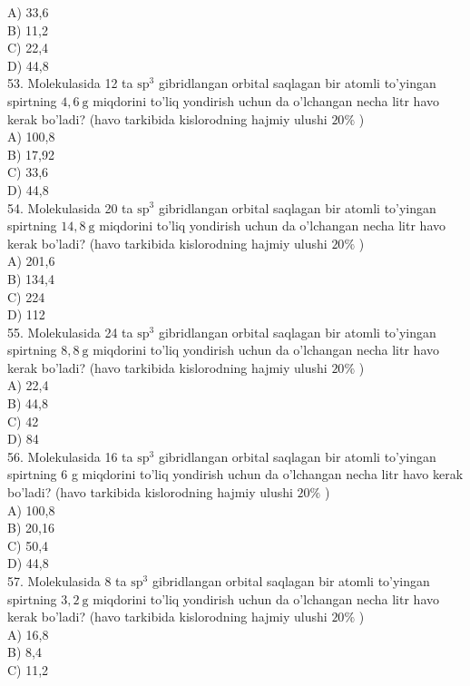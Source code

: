 A) 33,6\\
B) 11,2\\
C) 22,4\\
D) 44,8\\
53. Molekulasida 12 ta $\mathrm{sp}^{3}$ gibridlangan orbital saqlagan bir atomli to'yingan spirtning $4,6 \mathrm{~g}$ miqdorini to'liq yondirish uchun da o'lchangan necha litr havo kerak bo'ladi? (havo tarkibida kislorodning hajmiy ulushi $20 \%$ )\\
A) 100,8\\
B) 17,92\\
C) 33,6\\
D) 44,8\\
54. Molekulasida 20 ta $\mathrm{sp}^{3}$ gibridlangan orbital saqlagan bir atomli to'yingan spirtning $14,8 \mathrm{~g}$ miqdorini to'liq yondirish uchun da o'lchangan necha litr havo\\
kerak bo'ladi? (havo tarkibida kislorodning hajmiy ulushi $20 \%$ )\\
A) 201,6\\
B) 134,4\\
C) 224\\
D) 112\\
55. Molekulasida 24 ta $\mathrm{sp}^{3}$ gibridlangan orbital saqlagan bir atomli to'yingan spirtning $8,8 \mathrm{~g}$ miqdorini to'liq yondirish uchun da o'lchangan necha litr havo kerak bo'ladi? (havo tarkibida kislorodning hajmiy ulushi $20 \%$ )\\
A) 22,4\\
B) 44,8\\
C) 42\\
D) 84\\
56. Molekulasida 16 ta $\mathrm{sp}^{3}$ gibridlangan orbital saqlagan bir atomli to'yingan spirtning 6 g miqdorini to'liq yondirish uchun da o'lchangan necha litr havo kerak bo'ladi? (havo tarkibida kislorodning hajmiy ulushi $20 \%$ )\\
A) 100,8\\
B) 20,16\\
C) 50,4\\
D) 44,8\\
57. Molekulasida 8 ta $\mathrm{sp}^{3}$ gibridlangan orbital saqlagan bir atomli to'yingan spirtning $3,2 \mathrm{~g}$ miqdorini to'liq yondirish uchun da o'lchangan necha litr havo kerak bo'ladi? (havo tarkibida kislorodning hajmiy ulushi $20 \%$ )\\
A) 16,8\\
B) 8,4\\
C) 11,2\\
